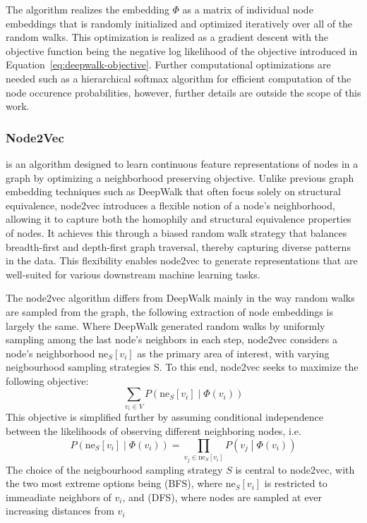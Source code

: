 The algorithm realizes the embedding \( \Phi \) as a matrix of individual node embeddings that is randomly initialized and optimized iteratively over all of the random walks. This optimization is realized as a gradient descent with the objective function being the negative log likelihood of the objective introduced in Equation~\ref{eq:deepwalk-objective}. Further computational optimizations are needed such as a hierarchical softmax algorithm for efficient computation of the node occurence probabilities, however, further details are outside the scope of this work.

\subsubsection{Node2Vec}

 is an algorithm designed to learn continuous feature representations of nodes in a graph by optimizing a neighborhood preserving objective. Unlike previous graph embedding techniques such as DeepWalk that often focus solely on structural equivalence, node2vec introduces a flexible notion of a node's neighborhood, allowing it to capture both the homophily and structural equivalence properties of nodes. It achieves this through a biased random walk strategy that balances breadth-first and depth-first graph traversal, thereby capturing diverse patterns in the data. This flexibility enables node2vec to generate representations that are well-suited for various downstream machine learning tasks.

The node2vec algorithm differs from DeepWalk mainly in the way random walks are sampled from the graph, the following extraction of node embeddings is largely the same. Where DeepWalk generated random walks by uniformly sampling among the last node's neighbors in each step, node2vec considers a node's neighborhood \( \mathrm{ne}_S [ v_i ] \) as the primary area of interest, with varying neigbourhood sampling strategies S. To this end, node2vec seeks to maximize the following objective:
\begin{equation}\label{eq:node2vec-objective}
	\sum_{v_i \in V} P \left( \mathrm{ne}_S[v_i] \middle| \Phi \left( v_i \right) \right)
\end{equation}
This objective is simplified further by assuming conditional independence between the likelihoods of observing different neighboring nodes, i.e.
\begin{equation}
	P \left( \mathrm{ne}_S[v_i] \middle| \Phi \left( v_i \right) \right) = \prod_{v_j \in \mathrm{ne}_S[v_i]} P \left( v_j \middle| \Phi \left( v_i \right) \right)
\end{equation}
The choice of the neigbourhood sampling strategy \( S \) is central to node2vec, with the two most extreme options being  (BFS), where \( \mathrm{ne}_S [ v_i ] \) is restricted to immeadiate neighbors of \( v_i \), and  (DFS), where nodes are sampled at ever increasing distances from \( v_i \)

